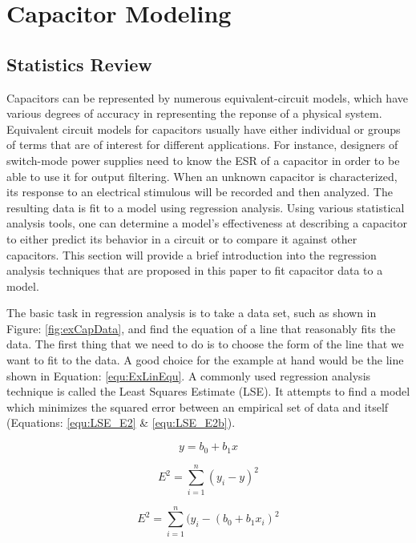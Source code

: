 \section {Capacitor Modeling}
\subsection{Statistics Review}
\label{sec:statReview}
Capacitors can be represented by numerous equivalent-circuit models, which have various degrees of accuracy in representing the reponse of a physical system. Equivalent circuit models for capacitors usually have either individual or groups of terms that are  of interest for different applications. For instance, designers of switch-mode power supplies need to know the ESR of a capacitor in order to be able to use it for output filtering. When an unknown capacitor is characterized, its response to an electrical stimulous will be recorded and then analyzed. The resulting data is fit to a model using regression analysis. Using various statistical analysis tools, one can determine a model's effectiveness at describing a capacitor to either predict its behavior in a circuit or to compare it against other capacitors. This section will provide a brief introduction into the regression analysis techniques that are proposed in this paper to fit capacitor data to a model.



The basic task in regression analysis is to take a data set, such as shown in Figure: \ref{fig:exCapData}, and find the equation of a line that reasonably fits the data. The first thing that we need to do is to choose the form of the line that we want to fit to the data. A good choice for the example at hand would be the line shown in Equation: \eqref{equ:ExLinEqu}. A commonly used regression analysis technique is called the Least Squares Estimate (LSE). It attempts to find a model which minimizes the squared error between an empirical set of data and itself (Equations: \eqref{equ:LSE_E2} \& \eqref{equ:LSE_E2b}).

\begin{equation}
\label{equ:ExLinEqu}
y = b_0 + b_1 x
\end{equation}

\begin{equation}
\label{equ:LSE_E2}
E^2 = \sum_{i=1}^{n} (y_i - y)^2
\end{equation}

\begin{equation}
\label{equ:LSE_E2b}
E^2 = \sum_{i=1}^{n} (y_i - (b_0 + b_1 x_i)^2
\end{equation}

